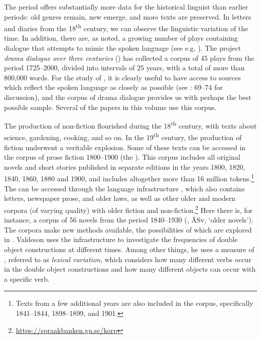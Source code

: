 \documentclass[output=paper]{langscibook}
\begin{document}
The  period offers substantially more data for the historical linguist than earlier periods: old genres remain, new emerge, and more texts are preserved. In letters and diaries from the 18\textsuperscript{th} century, we can observe the linguistic variation of the time. In addition, there are, as noted, a growing number of plays containing dialogue that attempts to mimic the spoken language (see e.g. \citealt{Widmark1970,Widmark2000,Thelander2007}). The project \textit{ drama dialogue over three centuries} (\citealt{MarttalaStromquist2001}) has collected a corpus of 45 plays from the period 1725–2000, divided into intervals of 25 years, with a total of more than 800,000 words. For the study of , it is clearly useful to have access to sources which reflect the spoken language as closely as possible (see \citealt{Magnusson2007}: 69–74 for discussion), and the corpus of  drama dialogue provides us with perhaps the best possible sample. Several of the papers in this volume use this corpus.



The production of non-fiction flourished during the 18\textsuperscript{th} century, with texts about science, gardening, cooking, and so on. In the 19\textsuperscript{th} century, the production of fiction underwent a veritable explosion. Some of these texts can be accessed in the corpus of  prose fiction 1800–1900 (the ). This corpus includes all  original novels and short stories published in separate editions in the years 1800, 1820, 1840, 1860, 1880 and 1900, and includes altogether more than 16 million tokens.\footnote{Texts from a few additional years are also included in the corpus, specifically 1841–1844, 1898–1899, and 1901.}  The  can be accessed through the language infrastructure  \citep{BorinEtAl2012}, which also contains letters, newspaper prose, and older laws, as well as other older and modern corpora (of varying quality) with older fiction and non-fiction.\footnote{\url{https://spraakbanken.gu.se/korp}}  Here there is, for instance, a corpus of 56 novels from the period 1840–1930 (, ÄSv, ‘older  novels’). The corpora make new methods available, the possibilities of which are explored in . Valdeson uses the  infrastructure to investigate the frequencies of double object constructions at different times. Among other things, he uses a measure of , referred to as \textit{lexical variation}, which considers how many different verbs occur in the double object constructions and how many different objects can occur with a specific verb.
\end{document}
